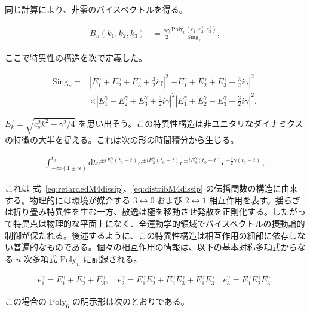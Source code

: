 \documentclass[a4paper,11pt]{ltjsarticle}
\numberwithin{equation}{section}
\newcommand{\dd}{\mathrm{d}}
\newcommand{\ee}{e}
\newcommand{\Eqs}[1]{Eqs.~(\ref{#1})}
\renewcommand{\Eqs}[1]{式~\eqref{#1}}
\begin{document}
同じ計算により、非零のバイスペクトルを得る。

\begin{align}\label{eq:D2resultdissip}
 B_\pi(k_1,k_2,k_3) &=  \frac{\alpha \gamma}{2} \frac{  \mathrm{Poly}_6\left(e_1^\gamma, e_2^\gamma,e_3^\gamma \right)}{ \mathrm{Sing}_\gamma} ,
\end{align}

ここで特異性の構造を次で定義した。

\begin{align}\label{eq:singdissip}
 \mathrm{Sing}_\gamma =& \left| E_1^{\gamma} + E_2^{\gamma} + E_3^{\gamma} + \frac{3}{2}i \gamma\right|^2 \left| -E_1^{\gamma} + E_2^{\gamma} + E_3^{\gamma} + \frac{3}{2}i \gamma\right|^2 \nonumber\\
 &\times \left| E_1^{\gamma} - E_2^{\gamma} + E_3^{\gamma} + \frac{3}{2}i \gamma\right|^2 \left| E_1^{\gamma} + E_2^{\gamma} - E_3^{\gamma} + \frac{3}{2}i \gamma\right|^2, 
\end{align}

$E_k^\gamma=\sqrt{c_s^2k^2-\gamma^2/4}$ を思い出そう。この特異性構造は非ユニタリなダイナミクスの特徴の大半を捉える。これは次の形の時間積分から生じる。

\begin{align}\label{eq:M4int}
\int_{-\infty(1\pm i \epsilon)}^{t_0} \dd t \ee^{ \pm i E_1^{\gamma} (t_0 - t) } \ee^{\pm i E_2^{\gamma} (t_0 - t) } \ee^{\pm i E_3^{\gamma} (t_0 - t) } \ee^{- \frac{3}{2}\gamma(t_0-t)}\,,
\end{align}

これは \Eqs{eq:retardedM4dissip}、\eqref{eq:distribM4dissip} の伝播関数の構造に由来する。物理的には環境が媒介する $3\leftrightarrow0$ および $2\leftrightarrow1$ 相互作用を表す。揺らぎは折り畳み特異性を生む一方、散逸は極を移動させ発散を正則化する。したがって特異点は物理的な平面上になく、全運動学的領域でバイスペクトルの摂動論的制御が保たれる。後述するように、この特異性構造は相互作用の細部に依存しない普遍的なものである。個々の相互作用の情報は、以下の基本対称多項式からなる $n$ 次多項式 $\mathrm{Poly}_n$ に記録される。

\begin{align}\label{eq:var}
e_1^\gamma = E_1^{\gamma} + E_2^{\gamma} + E_3^{\gamma}, \quad e_2^\gamma = E_1^{\gamma} E_2^{\gamma} + E_2^{\gamma}  E_3^{\gamma} + E_1^{\gamma} E_3^{\gamma} \quad  e_3^\gamma = E_1^{\gamma} E_2^{\gamma} E_3^{\gamma}.
\end{align}

この場合の $\mathrm{Poly}_6$ の明示形は次のとおりである。
\end{document}
